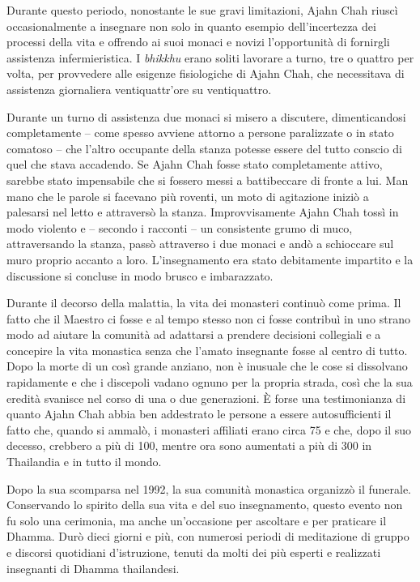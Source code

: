 Durante questo periodo, nonostante le sue gravi limitazioni, Ajahn Chah
riuscì occasionalmente a insegnare non solo in quanto esempio
dell'incertezza dei processi della vita e offrendo ai suoi monaci e
novizi l'opportunità di fornirgli assistenza infermieristica. I
\emph{bhikkhu} erano soliti lavorare a turno, tre o quattro per volta,
per provvedere alle esigenze fisiologiche di Ajahn Chah, che necessitava
di assistenza giornaliera ventiquattr'ore su ventiquattro.

Durante un turno di assistenza due monaci si misero a discutere,
dimenticandosi completamente -- come spesso avviene attorno a persone
paralizzate o in stato comatoso -- che l'altro occupante della stanza
potesse essere del tutto conscio di quel che stava accadendo. Se Ajahn
Chah fosse stato completamente attivo, sarebbe stato impensabile che si
fossero messi a battibeccare di fronte a lui. Man mano che le parole si
facevano più roventi, un moto di agitazione iniziò a palesarsi nel letto
e attraversò la stanza. Improvvisamente Ajahn Chah tossì in modo
violento e -- secondo i racconti -- un consistente grumo di muco,
attraversando la stanza, passò attraverso i due monaci e andò a
schioccare sul muro proprio accanto a loro. L'insegnamento era stato
debitamente impartito e la discussione si concluse in modo brusco e
imbarazzato.

Durante il decorso della malattia, la vita dei monasteri continuò come
prima. Il fatto che il Maestro ci fosse e al tempo stesso non ci fosse
contribuì in uno strano modo ad aiutare la comunità ad adattarsi a
prendere decisioni collegiali e a concepire la vita monastica senza che
l'amato insegnante fosse al centro di tutto. Dopo la morte di un così
grande anziano, non è inusuale che le cose si dissolvano rapidamente e
che i discepoli vadano ognuno per la propria strada, così che la sua
eredità svanisce nel corso di una o due generazioni. È forse una
testimonianza di quanto Ajahn Chah abbia ben addestrato le persone a
essere autosufficienti il fatto che, quando si ammalò, i monasteri
affiliati erano circa 75 e che, dopo il suo decesso, crebbero a più di
100, mentre ora sono aumentati a più di 300 in Thailandia e in tutto il
mondo.

Dopo la sua scomparsa nel 1992, la sua comunità monastica organizzò il
funerale. Conservando lo spirito della sua vita e del suo insegnamento,
questo evento non fu solo una cerimonia, ma anche un'occasione per
ascoltare e per praticare il Dhamma. Durò dieci giorni e più, con
numerosi periodi di meditazione di gruppo e discorsi quotidiani
d'istruzione, tenuti da molti dei più esperti e realizzati insegnanti di
Dhamma thailandesi.

